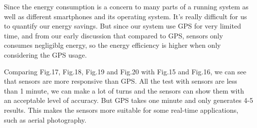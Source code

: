 \documentclass[journal]{IEEEtran}
\begin{document}
Since the energy consumption is a concern to many parts of a running system as well as different smartphones and its operating system. 
It's really difficult for us to quantify our energy savings.
But since our system use GPS for very limited time, and from our early discussion that compared to GPS, sensors only consumes negligiblg energy, so the energy efficiency is higher when only considering the GPS usage.

Comparing Fig.17, Fig.18, Fig.19 and Fig.20 with Fig.15 and Fig.16, we can see that sensors are more responsive than GPS. 
All the test with sensors are less than 1 minute, we can make a lot of turns and the sensors can show them with an acceptable level of accuracy.
But GPS takes one minute and only generates 4-5 results.
This makes the sensors more suitable for some real-time applications, such as aerial photography.
\end{document}
